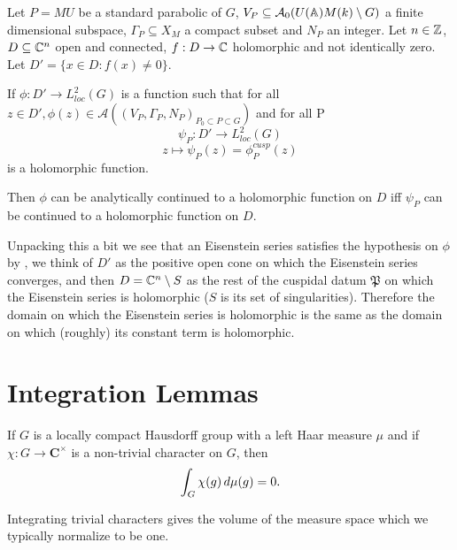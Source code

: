 \begin{Theorem}
        Let \(P = MU\) be a standard parabolic of \(G\), \(V_P\subseteq \mathcal{A}_0(U(\A)M(k)\setminus G)\) a finite dimensional subspace, \(\Gamma_P\subseteq X_M\) a compact subset and \(N_P\) an integer. Let \(n\in \Z\), \(D\subseteq \C^n\) open and connected, \(f: D\to \C\) holomorphic and not identically zero. Let \(D' = \{x\in D : f(x)\neq 0\}\).

        If \(\phi: D' \to L^2_{loc}(G)\) is a function such that for all \(z\in D', \phi(z)\in \mathcal{A}((V_P, \Gamma_P, N_P)_{P_0\subset P \subset G})\) and for all P 
        \[\psi_P: D' \to L^2_{loc}(G)\]
        \[z \mapsto \psi_P(z) = \phi_P^{cusp}(z)\]
        is a holomorphic function. 

        Then \(\phi\) can be analytically continued to a holomorphic function on \(D\) iff \(\psi_P\) can be continued to a holomorphic function on \(D\).
    \end{Theorem}
    
    Unpacking this a bit we see that an Eisenstein series satisfies the hypothesis on \(\phi\) by \cite[IV.1.9]{moeglinSpectralDecompositionEisenstein1995} , we think of \(D'\) as the positive open cone on which the Eisenstein series converges, and then \(D = \C^n \setminus S \) as the rest of the cuspidal datum \(\mathfrak{P}\) on which the Eisenstein series is holomorphic (\(S\) is its set of singularities). Therefore the domain on which the Eisenstein series is holomorphic is the same as the domain on which (roughly) its constant term is holomorphic.

\section{Integration Lemmas}
\begin{Theorem}\label{integrate_unitary_char}
	If \(G\) is a locally compact Hausdorff group with a left Haar measure \(\mu\) and if \(\chi\colon G\to \mathbf C^\times\) is a non-trivial character on \(G\), then
	\[ \int^{}_{G}\chi(g)\,d\mu(g) = 0. \]
\end{Theorem}
    Integrating trivial characters gives the volume of the measure space which we typically normalize to be one.

